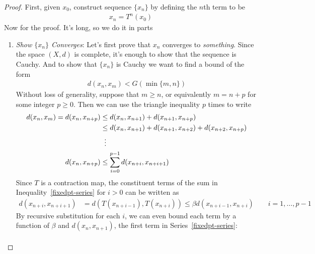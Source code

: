\documentclass[12pt]{article}
\numberwithin{equation}{section} %
\theoremstyle{plain}
\theoremstyle{definition}
\theoremstyle{remark}
\begin{document}
\begin{proof}
First, given $x_0$, construct sequence $\{x_n\}$ by defining the $n$th
term to be
\begin{align}
  \label{contraction-map-seq}
  x_n = T^n(x_0)
\end{align}
Now for the proof. It's long, so we do it in parts
\begin{enumerate}
\item
\emph{Show $\{x_n\}$ Converges}:
Let's first prove that $x_n$ converges to \emph{something}. Since the
space $(X,d)$ is complete, it's enough to show that the sequence is
Cauchy.  And to show that $\{x_n\}$ is Cauchy we want to find a bound of
the form
\begin{align*}
  d(x_n,x_m) < G(\min\{m,n\})
\end{align*}
Without loss of generality, suppose that $m\geq n$, or equivalently
$m=n+p$ for some integer $p\geq 0$. Then we can use the triangle
inequality $p$ times to write
\begin{align}
  d(x_n,x_m) = d(x_n,x_{n+p})
  &\leq d(x_n,x_{n+1}) + d(x_{n+1},x_{n+p}) \notag \\
  &\leq d(x_n,x_{n+1}) + d(x_{n+1},x_{n+2}) + d(x_{n+2},x_{n+p})\notag\\
  &\;\; \vdots\notag\\
  d(x_n,x_{n+p})
  &\leq \sum^{p-1}_{i=0} d(x_{n+i},x_{n+i+1})
  \label{fixedpt-series}
\end{align}
Since $T$ is a contraction map, the constituent terms of the sum in
Inequality~\ref{fixedpt-series} for $i>0$ can be written as
\begin{align*}
  d(x_{n+i},x_{n+i+1}) &=
  d(T(x_{n+i-1}),T(x_{n+i}))
  \leq
  \beta d(x_{n+i-1},x_{n+i})
  \qquad i = 1,\ldots,p-1
\end{align*}
By recursive substitution for each $i$, we can even bound each term by a
function of $\beta$ and $d(x_n,x_{n+1})$, the first term in
Series~\ref{fixedpt-series}:
\begin{align*}

\end{align*}
\end{enumerate}
\end{proof}
\end{document}
